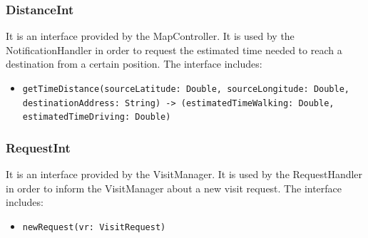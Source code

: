 \documentclass[a4paper,oneside,11pt]{book}
\newcommand{\red}[1]{\begingroup\color{punct}#1\endgroup}
\begin{document}
    \subsubsection{DistanceInt}
    It is an interface provided by the MapController. It is used by the NotificationHandler in order to request the estimated time needed to reach a destination from a certain position. The interface includes:
    \begin{itemize}
       \item \texttt{getTimeDistance(sourceLatitude: \red{Double}, sourceLongitude: \red{Double}, \newline destinationAddress: \red{String}) -> (estimatedTimeWalking: \red{Double}, \newline estimatedTimeDriving: \red{Double})}
   \end{itemize}
    \subsubsection{RequestInt}
    It is an interface provided by the VisitManager. It is used by the RequestHandler in order to inform the VisitManager about a new visit request. The interface includes:
    \begin{itemize}
       \item \texttt{newRequest(vr: \red{VisitRequest})}
   \end{itemize}
   
\end{document}
